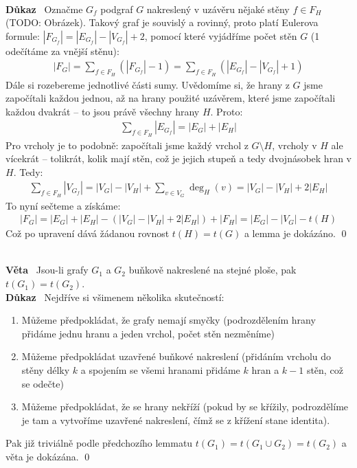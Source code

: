 \documentclass{article}
\renewcommand{\paragraph}[1]{\ \\\smallskip\noindent\textbf{#1}\ }
\begin{document}
\paragraph{Důkaz} Označme $G_f$ podgraf $G$ nakreslený v uzávěru nějaké stěny $f 
\in F_H$ (TODO: Obrázek). Takový graf je souvislý a rovinný, proto platí 
Eulerova formule: $|F_{G_f}| = |E_{G_f}| - |V_{G_f}| + 2$, pomocí které 
vyjádříme počet stěn $G$ (1 odečítáme za vnější stěnu):
\begin{align}
	|F_G| = \sum_{f\in F_H} (|F_{G_f}| - 1) = \sum_{f\in F_H} (|E_{G_f}| - 
	|V_{G_f}| + 1)
\end{align}
Dále si rozebereme jednotlivé části sumy. Uvědomíme si, že hrany z $G$ jsme 
započítali každou jednou, až na hrany použité uzávěrem, které jsme započítali 
každou dvakrát -- to jsou právě všechny hrany $H$. Proto:
\begin{align}
	\sum_{f\in F_H} |E_{G_f}| = |E_G| + |E_H|
\end{align}
Pro vrcholy je to podobně: započítali jsme každý vrchol z $G \setminus H$, 
vrcholy v $H$ ale vícekrát -- tolikrát, kolik mají stěn, což je jejich stupeň a 
tedy dvojnásobek hran v $H$.  Tedy:
\begin{align}
	\sum_{f\in F_H} |V_{G_f}| = |V_G| - |V_H| + \sum_{v\in V_G} \deg_H(v) = 
	|V_G| - |V_H| + 2|E_H|
\end{align}
To nyní sečteme a získáme:
\begin{align}
	|F_G| = |E_G| + |E_H| - (|V_G| - |V_H| + 2|E_H|) + |F_H| = |E_G| - |V_G| - 
	t(H)
\end{align}
Což po upravení dává žádanou rovnost $t(H) = t(G)$ a lemma je dokázáno.
\qed

\paragraph{Věta}
Jsou-li grafy $G_1$ a $G_2$ buňkově nakreslené na stejné ploše, pak $t(G_1) = 
t(G_2)$.
\paragraph{Důkaz}
Nejdříve si všimenem několika skutečností:
\begin{enumerate}
	\item Můžeme předpokládat, že grafy nemají smyčky (podrozdělením hrany 
	přidáme jednu hranu a jeden vrchol, počet stěn nezměníme)
	\item Můžeme předpokládat uzavřené buňkové nakreslení (přidáním vrcholu do 
	stěny délky $k$ a spojením se všemi hranami přidáme $k$ hran a $k-1$ stěn, 
	což se odečte)
	\item Můžeme předpokládat, že se hrany nekříží (pokud by se křížily, 
	podrozdělíme je tam a vytvoříme uzavřené nakreslení, čímž se z křížení stane 
	identita).
\end{enumerate}
Pak již triviálně podle předchozího lemmatu $t(G_1) = t(G_1 \cup G_2) = t(G_2)$ 
a věta je dokázána. \qed
\end{document}
